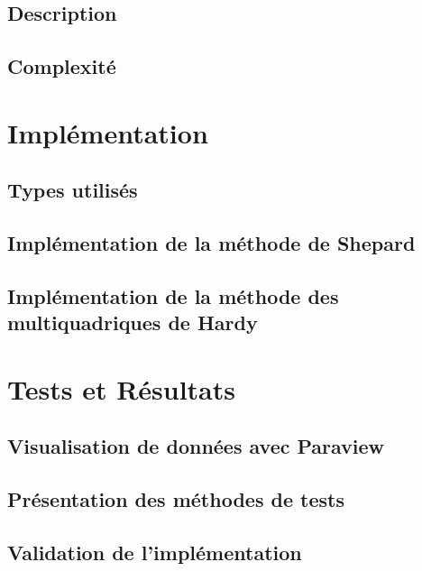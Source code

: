 \documentclass[a4paper,9pt]{article}
\begin{document}
\subsection{Description}
\label{subsec:hardy_description}

\subsection{Complexité}
\label{subsec:hardy_complexite}

\section{Implémentation}
\label{sec:implementation}

\subsection{Types utilisés}
\label{subsec:types}

\subsection{Implémentation de la méthode de Shepard}
\label{subsec:shepard_implementation}

\subsection{Implémentation de la méthode des multiquadriques de Hardy}
\label{subsec:hardy_implementation}

\section{Tests et Résultats}
\label{sec:tests_resultats}

\subsection{Visualisation de données avec Paraview}
\label{subsec:paraview}

\subsection{Présentation des méthodes de tests}
\label{subsec:presentation_tests}

\subsection{Validation de l'implémentation}
\label{subsec:validation_implementation}
\end{document}
